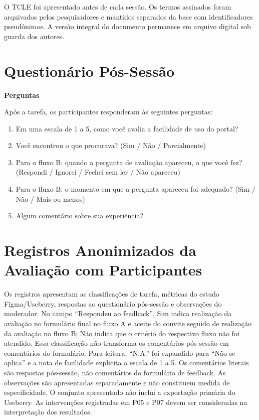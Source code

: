 \begin{apendicesenv}
O TCLE foi apresentado antes de cada sessão. Os termos assinados foram arquivados pelos pesquisadores e mantidos separados da base com identificadores pseudônimos. A versão integral do documento permanece em arquivo digital sob guarda dos autores.

\chapter{Questionário Pós-Sessão}
\label{ap:F}

\par\noindent\textbf{Perguntas}\par\nopagebreak

Após a tarefa, os participantes responderam às seguintes perguntas:

\begin{enumerate}
\def\labelenumi{\arabic{enumi}.}
\item
  Em uma escala de 1 a 5, como você avalia a facilidade de uso do portal?
\item
  Você encontrou o que procurava? (Sim / Não / Parcialmente)
\item
  Para o fluxo B: quando a pergunta de avaliação apareceu, o que você fez? (Respondi / Ignorei / Fechei sem ler / Não apareceu)
\item
  Para o fluxo B: o momento em que a pergunta apareceu foi adequado? (Sim / Não / Mais ou menos)
\item
  Algum comentário sobre sua experiência?
\end{enumerate}

\chapter{Registros Anonimizados da Avaliação com Participantes}
\label{ap:G}

Os registros apresentam as classificações de tarefa, métricas do estudo Figma/\allowbreak{}Useberry, respostas ao questionário pós-sessão e observações do moderador. No campo ``Respondeu ao feedback'', Sim indica realização da avaliação no formulário final no fluxo A e aceite do convite seguido de realização da avaliação no fluxo B; Não indica que o critério do respectivo fluxo não foi atendido. Essa classificação não transforma os comentários pós-sessão em comentários do formulário. Para leitura, ``N.A.'' foi expandido para ``Não se aplica'' e a nota de facilidade explicita a escala de 1 a 5. Os comentários literais são respostas pós-sessão, não comentários do formulário de feedback. As observações são apresentadas separadamente e não constituem medida de especificidade. O conjunto apresentado não inclui a exportação primária do Useberry. As intervenções registradas em P05 e P07 devem ser consideradas na interpretação dos resultados.


\end{apendicesenv}
